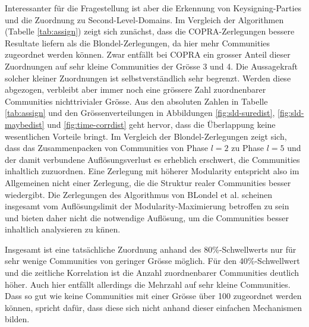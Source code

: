 Interessanter f\"ur die Fragestellung ist aber die Erkennung von
Keysigning-Parties und die Zuordnung zu Second-Level-Domains. Im
Vergleich der Algorithmen (Tabelle \ref{tab:assign}) zeigt sich
zun\"achst, dass die COPRA-Zerlegungen bessere Resultate liefern als
die Blondel-Zerlegungen, da hier mehr Communities zugeordnet werden
k\"onnen. Zwar entf\"allt bei COPRA ein grosser Anteil dieser
Zuordnungen auf sehr kleine Communities der Gr\"osse 3 und 4. Die
Aussagekraft solcher kleiner Zuordnungen ist selbstverst\"andlich sehr
begrenzt. Werden diese abgezogen, verbleibt aber immer noch eine
gr\"ossere Zahl zuordnenbarer Communities nichttrivialer Gr\"osse. Aus
den absoluten Zahlen in Tabelle \ref{tab:assign} und den
Gr\"ossenverteilungen in Abbildungen \ref{fig:sld-suredist},
\ref{fig:sld-maybedist} und \ref{fig:time-corrdist} geht hervor, dass
die \"Uberlappung keine wesentlichen Vorteile bringt. Im Vergleich der
Blondel-Zerlegungen zeigt sich, dass das Zusammenpacken von
Communities von Phase $l=2$ zu Phase $l=5$ und der damit verbundene
Aufl\"osungsverlust es erheblich erschwert, die Communities inhaltlich
zuzuordnen. Eine Zerlegung mit h\"oherer Modularity entspricht also im
Allgemeinen nicht einer Zerlegung, die die Struktur realer Communities
besser wiedergibt. Die Zerlegungen des Algorithmus von BLondel et
al. scheinen insgesamt vom Aufl\"osungslimit der
Modularity-Maximierung betroffen zu sein und bieten daher nicht die
notwendige Aufl\"osung, um die Communities besser inhaltlich
analysieren zu k\"nnen.


Insgesamt ist eine tats\"achliche Zuordnung anhand des
80\%-Schwellwerts nur f\"ur sehr wenige Communities von geringer
Gr\"osse m\"oglich. F\"ur den 40\%-Schwellwert und die zeitliche
Korrelation ist die Anzahl zuordnenbarer Communities deutlich
h\"oher. Auch hier entf\"allt allerdings die Mehrzahl auf sehr kleine
Communities.  Dass so gut wie keine Communities mit einer Gr\"osse
\"uber 100 zugeordnet werden k\"onnen, spricht daf\"ur, dass diese
sich nicht anhand dieser einfachen Mechanismen bilden.

